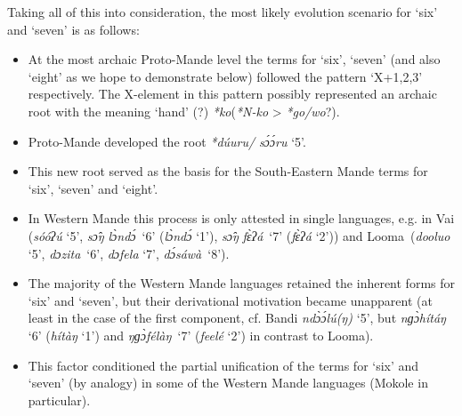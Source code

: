 Taking all of this into consideration, the most likely evolution scenario for ‘six’ and ‘seven’ is as follows: 

\begin{itemize}
\item At the most archaic Proto-Mande level the terms for ‘six’, ‘seven’ (and also ‘eight’ as we hope to demonstrate below) followed the pattern ‘X+1,2,3’ respectively. The X-element in this pattern possibly represented an archaic root with the meaning ‘hand’ (?) \textit{*ko}(\textit{*N-ko} > \textit{*go/wo}?).
\item Proto-Mande developed the root \textit{*dúuru/} \textit{s{\'{ɔ}}{\'{ɔ}}ru} ‘5’.
\item This new root served as the basis for the South-Eastern Mande terms for ‘six’, ‘seven’ and ‘eight’.
\item In Western Mande this process is only attested in single languages, e.g. in Vai (\textit{sóóʔú} ‘5’, \textit{s{\^{ɔ}}ŋ} \textit{l{\`{ɔ}}nd{\'{ɔ}}}~‘6’ (\textit{l{\`{ɔ}}nd{\'{ɔ}}} ‘1’), \textit{s{\^{ɔ}}ŋ} \textit{f{\`{ɛ}}ʔá}~‘7’ (\textit{f{\`{ɛ}}ʔá} ‘2’)) and Looma~(\textit{dooluo} ‘5’, \textit{dɔzita}~‘6’, \textit{dɔfela} ‘7’, \textit{d{\'{ɔ}}sáwà}~‘8’).
\item The majority of the Western Mande languages retained the inherent forms for ‘six’ and ‘seven’, but their derivational motivation became unapparent (at least in the case of the first component, cf. Bandi \textit{nd{\`{ɔ}}{\'{ɔ}}lú(ŋ)} ‘5’, but \textit{nɡ{\`{ɔ}}hítáŋ} ‘6’ (\textit{hítàŋ} ‘1’) and \textit{ŋɡ{\`{ɔ}}félàŋ~}‘7’ (\textit{feelé} ‘2’) in contrast to Looma).
\item This factor conditioned the partial unification of the terms for ‘six’ and ‘seven’ (by analogy) in some of the Western Mande languages (Mokole in particular).
\end{itemize}


